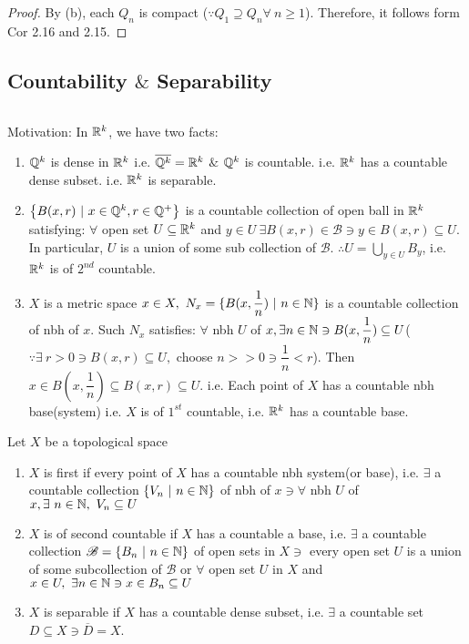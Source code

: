 \begin{proof}
	By (b), each $Q_n$ is compact ($\because Q_1 \supseteq Q_n \forall~n \geq 1$). Therefore, it follows form Cor 2.16 and 2.15.
\end{proof}

\subsection{Countability $\&$ Separability}$ $

Motivation: In $\mathbb{R}^k$, we have two facts:

\begin{enumerate}[wide,label=$\bullet$]
	\item $\mathbb{Q}^k$ is dense in $\mathbb{R}^k$ i.e. $\overline{\mathbb{Q}^k} = \mathbb{R}^k$ $\&$ $\mathbb{Q}^k$ is countable. i.e. $\mathbb{R}^k$ has a countable dense subset. i.e. $\mathbb{R}^k$ is separable.
	\item $\left\{B(x,r) ~|~ x \in \mathbb{Q}^k, r \in \mathbb{Q}^+ \right\}$ is a countable collection of open ball in $\mathbb{R}^k$ satisfying: $\forall$ open set $U \subseteq \mathbb{R}^k$ and $y \in U ~\exists B(x,r) \in \mathscr{B} \ni y \in B(x,r) \subseteq U$. In particular, $U$ is a union of some sub collection of $\mathscr B$. $\therefore U = \bigcup_{y \in U} B_y$, i.e. $\mathbb{R}^k$ is of $2^{nd}$ countable.
	\item $X$ is a metric space $x \in X,~N_x = \{B(x,\dfrac{1}{n})~|~n \in \mathbb{N}\}$ is a countable collection of nbh of $x$. Such $N_x$ satisfies:
	$\forall$ nbh $U$ of $x,\exists n \in \mathbb{N} \ni B(x,\dfrac{1}{n}) \subseteq U$($\because \exists~ r > 0 \ni B(x,r) \subseteq U,$ choose $n >> 0 \ni \dfrac{1}{n} < r$). Then $x \in B(x,\dfrac{1}{n}) \subseteq B(x,r) \subseteq U$. i.e. Each point of $X$ has a countable nbh base(system) i.e. $X$ is of $1^{st}$ countable, i.e. $\mathbb{R}^k$ has a countable base.
\end{enumerate}

\begin{defn}
	Let $X$ be a topological space
	
	\begin{enumerate}[wide]
		\item $X$ is first if every point of $X$ has a countable nbh system(or base), i.e. $\exists$ a countable collection $\{V_n ~|~ n \in \mathbb{N}\}$ of nbh of $x \ni \forall$ nbh $U$ of $x,\exists~ n \in \mathbb{N},~ V_n \subseteq U$
		\item $X$ is of second countable if $X$ has a countable a base, i.e. $\exists$ a countable collection $\mathscr B = \{B_n ~|~ n \in \mathbb{N}\}$ of open sets in $X \ni$ every open set $U$ is a union of some subcollection of $\mathscr B$ or $\forall$ open set $U$ in $X$ and $x \in U,~\exists n \in \mathbb{N} \ni x \in B_n \subseteq U$
		\item $X$ is separable if $X$ has a countable dense subset, i.e. $\exists$ a countable set $D \subseteq X \ni \overline{D} = X$.
	\end{enumerate}
\end{defn}


